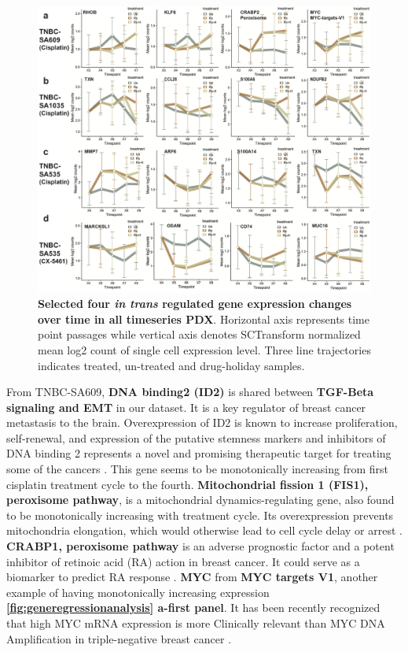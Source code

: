 \begin{figure}
\centering
 \includegraphics[width=\textwidth]{Figures/chap5/Intransgenelinetrajectories.png}
	
\caption[Four \textit{in trans} gene expression changed over time]
	{\small
	 \textbf{Selected four \textit{in trans} regulated gene expression changes over time in all timeseries PDX}.
	Horizontal axis represents time point passages while vertical axis denotes SCTransform normalized mean log2 count of single cell expression level. Three line trajectories indicates treated, un-treated and drug-holiday samples. }

	\label{fig:Intransgenelinetrajectories}
\end{figure} 

 
 From TNBC-SA609, \textbf{DNA binding2 (ID2)} is shared between \textbf{TGF-Beta signaling and EMT} in our dataset. It is a key regulator of breast cancer metastasis to the brain. Overexpression of ID2 is known to increase proliferation, self-renewal, and expression of the putative stemness markers and inhibitors of DNA binding 2 represents a novel and promising therapeutic target for treating some of the cancers \cite{bae2017inhibitor, kijewska2019using}. This gene seems to be monotonically increasing from first cisplatin treatment cycle to the fourth. \textbf{Mitochondrial fission 1 (FIS1), peroxisome pathway}, is a mitochondrial dynamics-regulating gene, also found to be monotonically increasing with treatment cycle. Its overexpression prevents mitochondria elongation, which would otherwise lead to cell cycle delay or arrest \cite{fan2015mir, anderson2018dysregulation}. \textbf{CRABP1, peroxisome pathway} is an adverse prognostic factor and a potent inhibitor of retinoic acid (RA) action in breast cancer. It could serve as a biomarker to predict RA response \cite{liu2015crabp1}. \textbf{MYC} from \textbf{MYC targets V1}, another example of having monotonically increasing expression \textbf{\autoref{fig:generegressionanalysis} a-first panel}. It has been recently recognized that high MYC mRNA expression is more Clinically relevant than MYC DNA Amplification in triple-negative breast cancer \cite{chen2008myc, katsuta2020high}.

